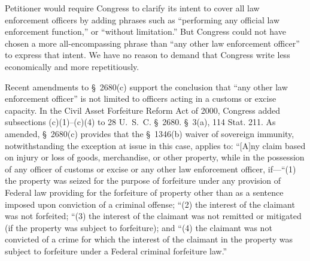 
  Petitioner would require Congress to clarify its intent to cover all law enforcement officers by adding phrases such as ``performing any official law enforcement function,'' or ``without limitation.'' But Congress could not have chosen a more all-encompassing phrase than ``any other law enforcement officer'' to express that intent. We have no reason to demand that Congress write less economically and more repetitiously.

  Recent amendments to \S~2680(c) support the conclusion that ``any other law enforcement officer'' is not limited to officers acting in a customs or excise capacity. In the Civil Asset Forfeiture Reform Act of 2000, Congress added subsections (c)(1)--(c)(4) to 28 U.~S.~C. \S~2680. \S~3(a), 114 Stat. 211. As amended, \S~2680(c) provides that the \S~1346(b) waiver of sovereign immunity, notwithstanding the exception at issue in this case, applies to: ``[A]ny claim based on injury or loss of goods, merchandise, or other property, while in the possession of any officer of customs or excise or any other law enforcement officer, if---``(1) the property was seized for the purpose of forfeiture under any provision of Federal law providing for the forfeiture of property other than as a sentence imposed upon conviction of a criminal offense; ``(2) the interest of the claimant was not forfeited; ``(3) the interest of the claimant was not remitted or mitigated (if the property was subject to forfeiture); and ``(4) the claimant was not convicted of a crime for which the interest of the claimant in the property was subject to forfeiture under a Federal criminal forfeiture law.''


